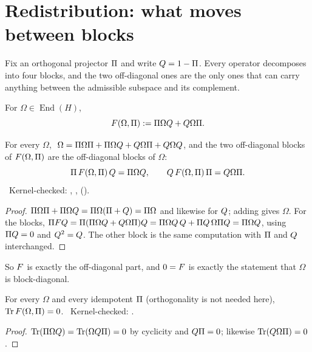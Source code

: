 \section{Redistribution: what moves between blocks}\label{sec:redistribution}

Fix an orthogonal projector $\Pi$ and write $Q=1-\Pi$. Every operator decomposes into four
blocks, and the two off-diagonal ones are the only ones that can carry anything between the
admissible subspace and its complement.

\begin{definition}\label{def:F}
For $\Omega\in\operatorname{End}(H)$,
\begin{equation}\label{eq:F}
   F(\Omega,\Pi):=\Pi\Omega Q+Q\Omega\Pi .
\end{equation}
\end{definition}

\begin{lemma}\label{lem:blocks}
For every $\Omega$, $\ \Omega=\PP\Omega\PP+\PP\Omega\QQ+\QQ\Omega\PP+\QQ\Omega\QQ$, and the two
off-diagonal blocks of $F(\Omega,\Pi)$ are the off-diagonal blocks of $\Omega$:
\[
   \Pi\,F(\Omega,\Pi)\,Q=\Pi\Omega Q,\qquad
   Q\,F(\Omega,\Pi)\,\Pi=Q\Omega\Pi .
\]
\T\ Kernel-checked: , ,
 ().
\end{lemma}

\begin{proof}
$\Pi\Omega\Pi+\Pi\Omega Q=\Pi\Omega(\Pi+Q)=\Pi\Omega$ and likewise for $Q$; adding gives
$\Omega$. For the blocks, $\Pi FQ=\Pi(\Pi\Omega Q+Q\Omega\Pi)Q=\Pi\Omega Q\,Q+\Pi Q\,\Omega\Pi Q=\Pi\Omega Q$,
using $\Pi Q=0$ and $Q^2=Q$. The other block is the same computation with $\Pi$ and $Q$
interchanged.
\end{proof}

So $F$ is exactly the off-diagonal part, and $0=F$ is exactly the statement that $\Omega$ is
block-diagonal.

\begin{theorem}\label{thm:traceless}
For every $\Omega$ and every idempotent $\Pi$ (orthogonality is not needed here),
$\operatorname{Tr}F(\Omega,\Pi)=0$.
\T\ Kernel-checked: .
\end{theorem}

\begin{proof}
$\operatorname{Tr}(\Pi\Omega Q)=\operatorname{Tr}(\Omega Q\Pi)=0$ by cyclicity and $Q\Pi=0$; likewise
$\operatorname{Tr}(Q\Omega\Pi)=0$.
\end{proof}

